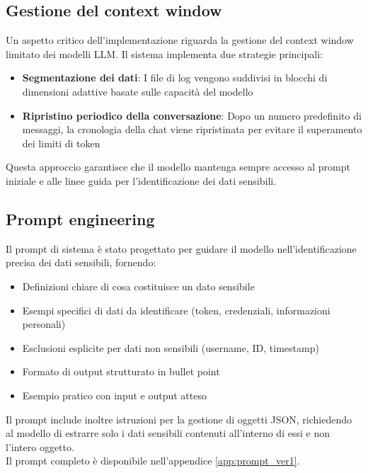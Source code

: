 \documentclass[12pt]{report}
\begin{document}
\subsection{Gestione del context window}
\label{subsec:ver1_context_window}

Un aspetto critico dell'implementazione riguarda la gestione del context window limitato dei modelli LLM. Il sistema implementa due strategie principali:

\begin{itemize}
    \item \textbf{Segmentazione dei dati}: I file di log vengono suddivisi in blocchi di dimensioni adattive basate sulle capacità del modello
    \item \textbf{Ripristino periodico della conversazione}: Dopo un numero predefinito di messaggi, la cronologia della chat viene ripristinata per evitare il superamento dei limiti di token
\end{itemize}

Questa approccio garantisce che il modello mantenga sempre accesso al prompt iniziale e alle linee guida per l'identificazione dei dati sensibili.

\subsection{Prompt engineering}
\label{subsec:ver1_prompt_engineering}

Il prompt di sistema è stato progettato per guidare il modello nell'identificazione precisa dei dati sensibili, fornendo:

\begin{itemize}
    \item Definizioni chiare di cosa costituisce un dato sensibile
    \item Esempi specifici di dati da identificare (token, credenziali, informazioni personali)
    \item Esclusioni esplicite per dati non sensibili (username, ID, timestamp)
    \item Formato di output strutturato in bullet point
    \item Esempio pratico con input e output atteso
\end{itemize}

Il prompt include inoltre istruzioni per la gestione di oggetti JSON, richiedendo al modello di estrarre solo i dati sensibili contenuti all'interno di essi e non l'intero oggetto. \\
Il prompt completo è disponibile nell'appendice \ref{app:prompt_ver1}.
\end{document}
